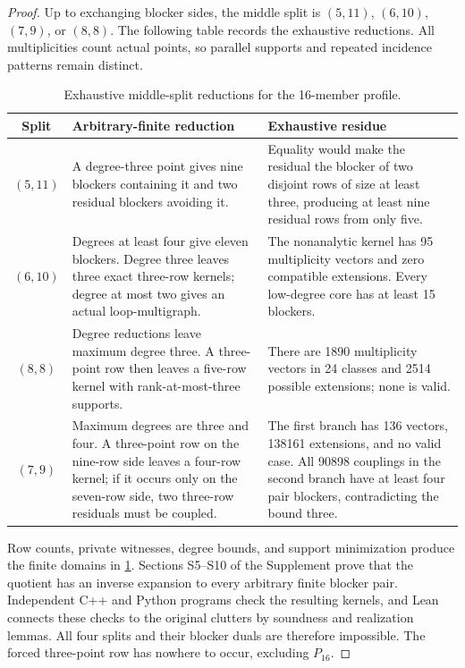 \documentclass[a4paper,fleqn,longmktitle]{cas-sc}
\theoremstyle{definition}
\theoremstyle{remark}
\begin{document}
\begin{proof}
Up to exchanging blocker sides, the middle split is $(5,11)$, $(6,10)$,
$(7,9)$, or $(8,8)$.  The following table records the exhaustive reductions.
All multiplicities count actual points, so parallel supports and repeated
incidence patterns remain distinct.
\begin{table}[htbp]
\centering
\small
\setlength{\tabcolsep}{5pt}
\renewcommand{\arraystretch}{1.16}
\begin{tabular}{c p{} p{}}
\toprule
Split & Arbitrary-finite reduction & Exhaustive residue \\
\midrule
$(5,11)$ & A degree-three point gives nine blockers containing it and two
residual blockers avoiding it. & Equality would make the residual the blocker
of two disjoint rows of size at least three, producing at least nine residual
rows from only five. \\
$(6,10)$ & Degrees at least four give eleven blockers.  Degree three leaves
three exact three-row kernels; degree at most two gives an actual
loop-multigraph. & The nonanalytic kernel has 95 multiplicity vectors and zero
compatible extensions.  Every low-degree core has at least 15 blockers. \\
$(8,8)$ & Degree reductions leave maximum degree three.  A three-point row
then leaves a five-row kernel with rank-at-most-three supports. & There are
1890 multiplicity vectors in 24 classes and 2514 possible extensions; none is
valid. \\
$(7,9)$ & Maximum degrees are three and four.  A three-point row on the
nine-row side leaves a four-row kernel; if it occurs only on the seven-row
side, two three-row residuals must be coupled. & The first branch has 136
vectors, 138161 extensions, and no valid case.  All 90898 couplings in the
second branch have at least four pair blockers, contradicting the bound three.
\\
\bottomrule
\end{tabular}
\caption{Exhaustive middle-split reductions for the 16-member profile.}
\label{tab:exact-splits}
\end{table}

Row counts, private witnesses, degree bounds, and support minimization produce
the finite domains in \cref{tab:exact-splits}.  Sections S5--S10 of the
Supplement prove that the quotient has an inverse expansion to every
arbitrary finite blocker pair.  Independent C++ and Python programs check the
resulting kernels, and Lean connects these checks to the original clutters by
soundness and realization lemmas.  All four splits and their blocker duals
are therefore impossible.  The forced three-point row has nowhere to occur,
excluding $P_{16}$.
\end{proof}
\end{document}
